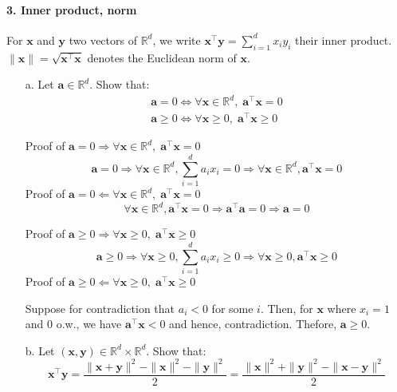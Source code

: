 \documentclass[11pt]{article}
\newcommand{\R}{\mathbb{R}}                     %
\newcommand{\bx}{\mathbf{x}}
\newcommand{\by}{\mathbf{y}}
\newcommand{\ba}{\mathbf{a}}
\begin{document}
\paragraph{3. Inner product, norm}

For $\bx$ and $\by$ two vectors of $\R^d$, we write $\bx^\intercal \by
= \sum_{i=1}^d x_iy_i$ their inner product. $\|\bx\| = \sqrt{\bx^\intercal
\bx}$ denotes the Euclidean norm of $\bx$.

\begin{itemize}
    \item[a.] Let $\ba\in\R^d$. Show that:
        \begin{gather*}
            \ba = 0 \Longleftrightarrow \forall \bx\in\R^d,\;\ba^\intercal \bx = 0\\
            \ba \geq 0 \Longleftrightarrow \forall \bx\geq 0,\;\ba^\intercal \bx \geq 0
        \end{gather*}
        
\color{blue}
Proof of $ \ba = 0 \Rightarrow \forall \bx\in\R^d,\;\ba^\intercal \bx = 0$
$$\ba=0 \Rightarrow \forall \bx \in \R^d, \sum_{i=1}^d a_ix_i=0 \Rightarrow \forall \bx \in \R^d, \ba^\intercal \bx=0 $$
Proof of $ \ba = 0 \Leftarrow \forall \bx\in\R^d,\;\ba^\intercal \bx = 0$
$$\forall \bx \in \R^d, \ba^\intercal \bx=0 \Rightarrow \ba^\intercal \ba=0 \Rightarrow \ba=0$$

Proof of  $\ba \geq 0 \Rightarrow \forall \bx\geq 0,\;\ba^\intercal \bx \geq 0$
$$\ba \geq 0 \Rightarrow \forall \bx \geq 0, \sum_{i=1}^d a_ix_i \geq 0 \Rightarrow \forall \bx \geq 0, \ba^\intercal \bx \geq 0$$
Proof of  $\ba \geq 0 \Leftarrow \forall \bx\geq 0,\;\ba^\intercal \bx \geq 0$

Suppose for contradiction that $a_i<0$ for some $i$. Then, for $\bx$ where $x_i=1$ and $0$ o.w., we have $\ba^\intercal \bx <0$ and hence, contradiction. Thefore, $\ba \geq 0$.
\color{black}

    \item[b.] Let $(\bx, \by)\in\R^d\times\R^d$. Show that:
        \begin{displaymath}
            \bx^\intercal \by = \frac{\|\bx+\by\|^2 - \|\bx\|^2-\|\by\|^2}{2}
            = \frac{\|\bx\|^2 + \|\by\|^2 - \|\bx-\by\|^2}{2}
        \end{displaymath}
        

\end{itemize}
\end{document}
